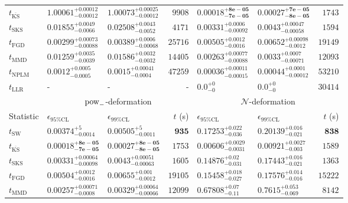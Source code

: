 \begin{tabular}{l|llr|llr}
	$t_{\overline{\mathrm{KS}}}$ & $1.00061_{-0.00012}^{+0.00012}$ & $1.00073_{-0.00012}^{+0.00025}$ & $9908$ & ${\mathbf{0.00018_{-7e-05}^{+8e-05}}}$ & ${\mathbf{0.00027_{-8e-05}^{+7e-05}}}$ & $1743$ \\
	$t_{\mathrm{SKS}}$ & $0.01855_{-0.0066}^{+0.0049}$ & $0.02508_{-0.0052}^{+0.0043}$ & $4171$ & $0.00331_{-0.00092}^{+0.0006}$ & $0.0043_{-0.00058}^{+0.00047}$ & $1594$ \\
	$t_{\mathrm{FGD}}$ & ${\mathbf{0.00299_{-0.00088}^{+0.00073}}}$ & ${\mathbf{0.00389_{-0.00068}^{+0.0006}}}$ & $25716$ & $0.00505_{-0.0016}^{+0.0012}$ & $0.00652_{-0.0012}^{+0.00098}$ & $19149$ \\
	$t_{\mathrm{MMD}}$ & $0.01259_{-0.0039}^{+0.0035}$ & $0.01586_{-0.0032}^{+0.0032}$ & $14405$ & $0.00263_{-0.00088}^{+0.00077}$ & $0.0033_{-0.00071}^{+0.0007}$ & $12093$ \\
\rowcolor{red!35}	$t_{\mathrm{NPLM}}$ & $0.0012_{-0.0005}^{+0.0005}$ & $0.0015_{-0.0004}^{+0.00041}$ & $47259$ & $0.00036_{-0.00015}^{+0.00011}$ & $0.00044_{-0.00012}^{+0.0001}$ & $53210$ \\
	$t_{\mathrm{LLR}}$ & - & - & - & $0.0_{-0}^{+0}$ & $0.0_{-0}^{+0}$ & $30414$ \\
	\toprule
	\multicolumn{1}{c}{} & \multicolumn{3}{c}{$\rm{pow}_{-}$-deformation} & \multicolumn{3}{c}{$\mathcal{N}$-deformation} \\
	Statistic & $\epsilon_{95\%\mathrm{CL}}$ & $\epsilon_{99\%\mathrm{CL}}$ & $t$ (s) & $\epsilon_{95\%\mathrm{CL}}$ & $\epsilon_{99\%\mathrm{CL}}$ & $t$ (s) \\
	\midrule
	$t_{\mathrm{SW}}$ & $0.00374_{-0.0014}^{+5}$ & $0.00505_{-0.0011}^{+5}$ & ${\mathbf{935}}$ & $0.17253_{-0.036}^{+0.022}$ & $0.20139_{-0.021}^{+0.016}$ & ${\mathbf{838}}$ \\
	$t_{\overline{\mathrm{KS}}}$ & ${\mathbf{0.00018_{-7e-05}^{+8e-05}}}$ & ${\mathbf{0.00027_{-8e-05}^{+8e-05}}}$ & $1753$ & ${\mathbf{0.00606_{-0.0031}^{+0.0029}}}$ & ${\mathbf{0.00921_{-0.003}^{+0.0027}}}$ & $1589$ \\
	$t_{\mathrm{SKS}}$ & $0.00331_{-0.00098}^{+0.00064}$ & $0.0043_{-0.00063}^{+0.00051}$ & $1605$ & $0.14876_{-0.031}^{+0.02}$ & $0.17443_{-0.021}^{+0.016}$ & $1363$ \\
	$t_{\mathrm{FGD}}$ & $0.00504_{-0.0016}^{+0.0012}$ & $0.00655_{-0.0012}^{+0.001}$ & $19105$ & $0.15458_{-0.027}^{+0.018}$ & $0.17576_{-0.016}^{+0.014}$ & $15222$ \\
	$t_{\mathrm{MMD}}$ & $0.00257_{-0.0008}^{+0.00071}$ & $0.00329_{-0.00066}^{+0.00064}$ & $12099$ & $0.67808_{-0.11}^{+0.07}$ & $0.7615_{-0.069}^{+0.053}$ & $8142$ \\

\end{tabular}

